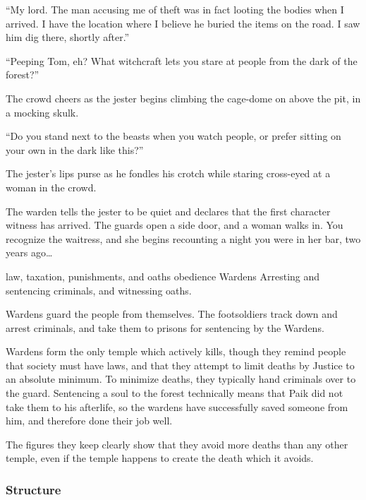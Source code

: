 \begin{multicols}{2}
{    ``My lord.
    The man accusing me of theft was in fact looting the bodies when I arrived.
    I have the location where I believe he buried the items on the road.
    I saw him dig there, shortly after.''

    {\sffamily ``Peeping Tom, eh?
    What witchcraft lets you stare at people from the dark of the forest?''}

    The crowd cheers as the jester begins climbing the cage-dome on above the pit, in a mocking skulk.

    {\sffamily ``Do you stand next to the beasts when you watch people, or prefer sitting on your own in the dark like this?''}

    The jester's lips purse as he fondles his crotch while staring cross-eyed at a woman in the crowd.

    The warden tells the jester to be quiet and declares that the first character witness has arrived.
    The guards open a side door, and a woman walks in.
    You recognize the waitress, and she begins recounting a night you were in her bar, two years ago\ldots
  }%
  {law, taxation, punishments, and oaths}%
  {obedience}%
  {Wardens}%
  {
    Arresting and sentencing criminals, and witnessing oaths.
  }%

Wardens guard the people from themselves.
The footsoldiers track down and arrest criminals, and take them to prisons for sentencing by the Wardens.

Wardens form the only temple which actively kills, though they remind people that society must have laws, and that they attempt to limit deaths by Justice to an absolute minimum.
To minimize deaths, they typically hand criminals over to the \gls{guard}.
Sentencing a soul to the forest technically means that Paik did not take them to his afterlife, so the wardens have successfully saved someone from him, and therefore done their job well.

The figures they keep clearly show that they avoid more deaths than any other temple, even if the temple happens to create the death which it avoids.

\subsubsection{Structure}


\end{multicols}
